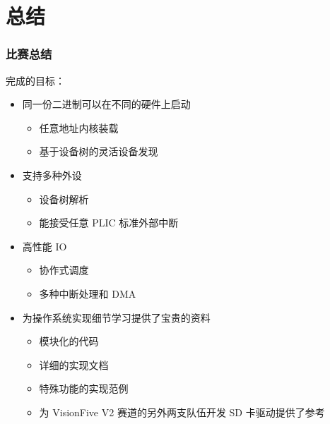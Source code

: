\section{总结}

\begin{frame}
    \frametitle{比赛总结}

    完成的目标：
    \begin{itemize}
        \item 同一份二进制可以在不同的硬件上启动
              \begin{itemize}
                  \item 任意地址内核装载
                  \item 基于设备树的灵活设备发现
              \end{itemize}
        \item 支持多种外设
              \begin{itemize}
                  \item 设备树解析
                  \item 能接受任意 PLIC 标准外部中断
              \end{itemize}
        \item 高性能 IO
              \begin{itemize}
                  \item 协作式调度
                  \item 多种中断处理和 DMA
              \end{itemize}
        \item 为操作系统实现细节学习提供了宝贵的资料
              \begin{itemize}
                  \item 模块化的代码
                  \item 详细的实现文档
                  \item 特殊功能的实现范例
                  \item 为 VisionFive V2 赛道的另外两支队伍开发 SD 卡驱动提供了参考
              \end{itemize}
    \end{itemize}

\end{frame}